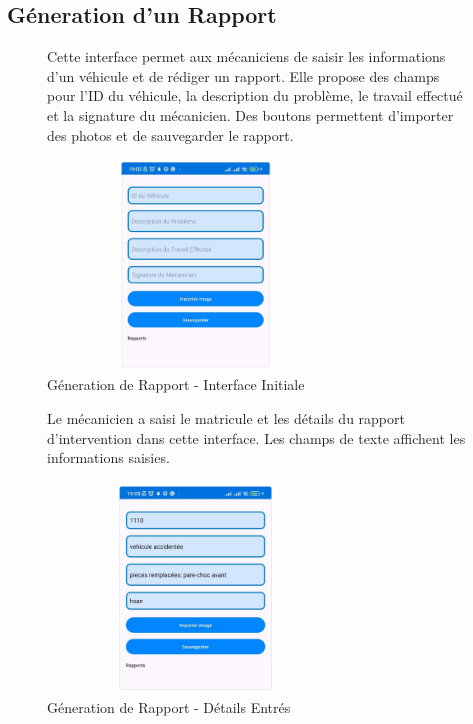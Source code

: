 \newpage
\subsection{Géneration d'un Rapport}
\begin{figure}[htbp]
    \centering
    \begin{minipage}{0.58\textwidth}
        \raggedright
        Cette interface permet aux mécaniciens de saisir les informations d'un véhicule et de rédiger un rapport. Elle propose des champs pour l'ID du véhicule, la description du problème, le travail effectué et la signature du mécanicien. Des boutons permettent d'importer des photos et de sauvegarder le rapport.
    \end{minipage}
    \hfill
    \begin{minipage}{0.39\textwidth}
        \centering
        \includegraphics[width=0.7\textwidth,height=5.6cm]{chap5.images/r11.png}
        \caption{\centering Géneration de Rapport - Interface Initiale }
    \end{minipage}
\end{figure}

\begin{figure}[htbp]
    \centering
    \begin{minipage}{0.58\textwidth}
        \raggedright
        Le mécanicien a saisi le matricule et les détails du rapport d'intervention dans cette interface. Les champs de texte affichent les informations saisies.
    \end{minipage}
    \hfill
    \begin{minipage}{0.39\textwidth}
        \centering
        \includegraphics[width=0.7\textwidth,height=5.6cm]{chap5.images/r22.png}
        \caption{\centering Géneration de Rapport - Détails Entrés }
    \end{minipage}
\end{figure}

